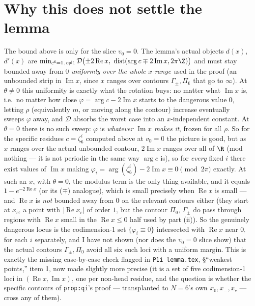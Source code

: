 \documentclass[11pt]{article}
\begin{document}
\section{Why this does not settle the lemma}

The bound above is only for the slice $v_0=0$. The lemma's actual objects $d(x)$, $d'(x)$ are
$\min_{c^6=1,\,c\ne1}\mathcal D\bigl(\pm2\operatorname{Re}x,\ \operatorname{dist}(\arg c\mp2\operatorname{Im}x,2\pi\Z)\bigr)$
and must stay bounded away from $0$ \emph{uniformly over the whole $x$-range} used in the proof (an
unbounded strip in $\operatorname{Im}x$, since $x$ ranges over contours $\Gamma_\pm,\Pi_0$ that go to
$\infty$). At $\theta\ne0$ this uniformity is exactly what the rotation buys: no matter what
$\operatorname{Im}x$ is, i.e.\ no matter how close $\varphi=\arg c-2\operatorname{Im}x$ starts to the
dangerous value $0$, letting $\rho$ (equivalently $m$, or moving along the contour) increase eventually
sweeps $\varphi$ away, and $\mathcal D$ absorbs the worst case into an $x$-independent constant. At
$\theta=0$ there is no such sweep: $\varphi$ is \emph{whatever $\operatorname{Im}x$ makes it}, frozen for
all $\rho$. So for the specific residues $c=\zeta_6^i$ computed above at $v_0=0$ the picture is good, but
as $x$ ranges over the actual unbounded contour, $2\operatorname{Im}x$ ranges over all of $\R$ (mod
nothing --- it is not periodic in the same way $\arg c$ is), so for \emph{every} fixed $i$ there exist
values of $\operatorname{Im}x$ making $\varphi_i=\arg(\zeta_6^i)-2\operatorname{Im}x\equiv0\pmod{2\pi}$
exactly. At such an $x$, with $\theta=0$, the modulus term is the only thing available, and it equals
$1-e^{-2\operatorname{Re}x}$ (or its ($\mp$) analogue), which is small precisely when
$\operatorname{Re}x$ is small --- and $\operatorname{Re}x$ is \emph{not} bounded away from $0$ on the
relevant contours either (they start at $x_c$, a point with $|\operatorname{Re}x_c|$ of order $1$, but
the contour $\Pi_0$, $\Gamma_\pm$ do pass through regions with $\operatorname{Re}x$ small in the
$\operatorname{Re}x\le0$ half used by part (ii)). So the genuinely dangerous locus is the codimension-1 set
$\{\varphi_i\equiv0\}$ intersected with $\operatorname{Re}x$ near $0$, for each $i$ separately, and I have
not shown (nor does the $v_0=0$ slice show) that the actual contours $\Gamma_\pm,\Pi_0$ avoid all six such
loci with a uniform margin. This is exactly the missing case-by-case check flagged in
\texttt{P1i\_lemma.tex}, \S``weakest points,'' item 1, now made slightly more precise (it is a set of five
codimension-1 loci in $(\operatorname{Re}x,\operatorname{Im}x)$, one per non-head residue, and the
question is whether the specific contours of \texttt{prop:qi}'s proof --- transplanted to $N=6$'s own
$x_0,x_-,x_c$ --- cross any of them).
\end{document}
